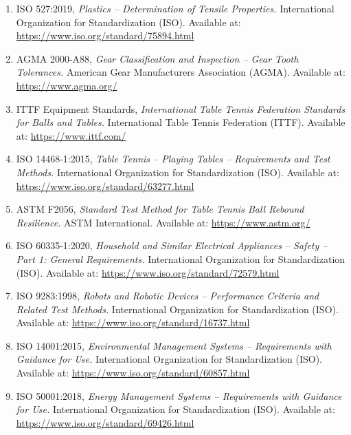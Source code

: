 \documentclass[12pt]{article}
\begin{document}
\begin{enumerate}
    \item ISO 527:2019, \textit{Plastics – Determination of Tensile Properties.} International Organization for Standardization (ISO). Available at: \url{https://www.iso.org/standard/75894.html}

    \item AGMA 2000-A88, \textit{Gear Classification and Inspection – Gear Tooth Tolerances.} American Gear Manufacturers Association (AGMA). Available at: \url{https://www.agma.org/}

    \item ITTF Equipment Standards, \textit{International Table Tennis Federation Standards for Balls and Tables.} International Table Tennis Federation (ITTF). Available at: \url{https://www.ittf.com/}

    \item ISO 14468-1:2015, \textit{Table Tennis – Playing Tables – Requirements and Test Methods.} International Organization for Standardization (ISO). Available at: \url{https://www.iso.org/standard/63277.html}

    \item ASTM F2056, \textit{Standard Test Method for Table Tennis Ball Rebound Resilience.} ASTM International. Available at: \url{https://www.astm.org/}

    \item ISO 60335-1:2020, \textit{Household and Similar Electrical Appliances – Safety – Part 1: General Requirements.} International Organization for Standardization (ISO). Available at: \url{https://www.iso.org/standard/72579.html}

    \item ISO 9283:1998, \textit{Robots and Robotic Devices – Performance Criteria and Related Test Methods.} International Organization for Standardization (ISO). Available at: \url{https://www.iso.org/standard/16737.html}

    \item ISO 14001:2015, \textit{Environmental Management Systems – Requirements with Guidance for Use.} International Organization for Standardization (ISO). Available at: \url{https://www.iso.org/standard/60857.html}

    \item ISO 50001:2018, \textit{Energy Management Systems – Requirements with Guidance for Use.} International Organization for Standardization (ISO). Available at: \url{https://www.iso.org/standard/69426.html}
\end{enumerate}
\end{document}
